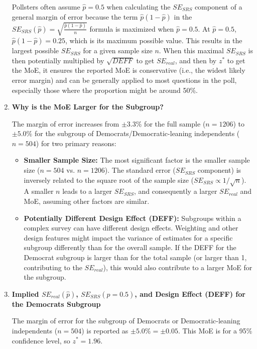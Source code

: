 \documentclass[12pt]{article}
\begin{document}
\begin{enumerate}
Pollsters often assume $\hat{p} = 0.5$ when calculating the $SE_{SRS}$ component of a general margin of error because the term $\hat{p}(1-\hat{p})$ in the $SE_{SRS}(\hat{p}) = \sqrt{\frac{\hat{p}(1-\hat{p})}{n}}$ formula is maximized when $\hat{p} = 0.5$. At $\hat{p}=0.5$, $\hat{p}(1-\hat{p}) = 0.25$, which is its maximum possible value. This results in the largest possible $SE_{SRS}$ for a given sample size $n$. When this maximal $SE_{SRS}$ is then potentially multiplied by $\sqrt{DEFF}$ to get $SE_{real}$, and then by $z^*$ to get the MoE, it ensures the reported MoE is conservative (i.e., the widest likely error margin) and can be generally applied to most questions in the poll, especially those where the proportion might be around 50\%.

\item \textbf{Why is the MoE Larger for the Subgroup?}

The margin of error increases from $\pm 3.3\%$ for the full sample ($n=1206$) to $\pm 5.0\%$ for the subgroup of Democrats/Democratic-leaning independents ($n=504$) for two primary reasons:
\begin{itemize}
    \item \textbf{Smaller Sample Size:} The most significant factor is the smaller sample size ($n=504$ vs. $n=1206$). The standard error ($SE_{SRS}$ component) is inversely related to the square root of the sample size ($SE_{SRS} \propto 1/\sqrt{n}$). A smaller $n$ leads to a larger $SE_{SRS}$, and consequently a larger $SE_{real}$ and MoE, assuming other factors are similar.
    \item \textbf{Potentially Different Design Effect (DEFF):} Subgroups within a complex survey can have different design effects. Weighting and other design features might impact the variance of estimates for a specific subgroup differently than for the overall sample. If the DEFF for the Democrat subgroup is larger than for the total sample (or larger than 1, contributing to the $SE_{real}$), this would also contribute to a larger MoE for the subgroup.
\end{itemize}

\item \textbf{Implied $SE_{real}(\hat{p})$, $SE_{SRS}(\hat{p}=0.5)$, and Design Effect (DEFF) for the Democrats Subgroup}

The margin of error for the subgroup of Democrats or Democratic-leaning independents ($n=504$) is reported as $\pm 5.0\% = \pm 0.05$. This MoE is for a 95\% confidence level, so $z^* = 1.96$.


\end{enumerate}
\end{document}
